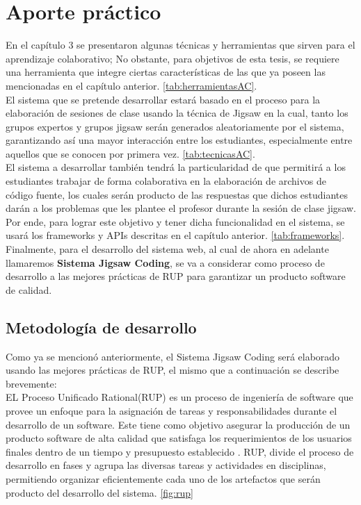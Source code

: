\chapter{Aporte práctico}

En el capítulo 3 se presentaron algunas técnicas y herramientas que sirven para el aprendizaje colaborativo; No obstante, para objetivos de esta tesis, se requiere una herramienta que integre ciertas características de las que ya poseen las mencionadas en el capítulo anterior.  \autoref{tab:herramientasAC}.\\

El sistema que se pretende desarrollar estará basado en el proceso para la elaboración de sesiones de clase usando la técnica de Jigsaw en la cual, tanto los grupos expertos y grupos jigsaw serán generados aleatoriamente por el sistema, garantizando así una mayor interacción entre los estudiantes, especialmente entre aquellos que se conocen por primera vez. \autoref{tab:tecnicasAC}.\\

El sistema a desarrollar también tendrá la particularidad de que permitirá a los estudiantes trabajar de forma colaborativa en la elaboración de archivos de código fuente, los cuales serán producto de las respuestas que dichos estudiantes darán a los problemas que les plantee el profesor durante la sesión de clase jigsaw. Por ende, para lograr este objetivo y tener dicha funcionalidad en el sistema, se usará los frameworks y APIs descritas en el capítulo anterior.  \autoref{tab:frameworks}.\\

Finalmente, para el desarrollo del sistema web, al cual de ahora en adelante llamaremos \textbf{Sistema Jigsaw Coding}, se va a considerar como proceso de desarrollo a las mejores prácticas de RUP para garantizar un producto software de calidad.

\section{Metodología de desarrollo}
Como ya se mencionó anteriormente, el Sistema Jigsaw Coding será elaborado usando las mejores prácticas de RUP, el mismo que a continuación se describe brevemente:\\

EL Proceso Unificado Rational(RUP) es un proceso de ingeniería de software que provee un enfoque para la asignación de tareas y responsabilidades durante el desarrollo de un software. Este tiene como objetivo asegurar la producción de un producto software de alta calidad que satisfaga los requerimientos de los usuarios finales dentro de un tiempo y presupuesto establecido \cite{rup_ibm_2014}. RUP, divide el proceso de desarrollo en fases y agrupa las diversas tareas y actividades en disciplinas, permitiendo organizar eficientemente cada uno de los artefactos que serán producto del desarrollo del sistema. \autoref{fig:rup}\\

